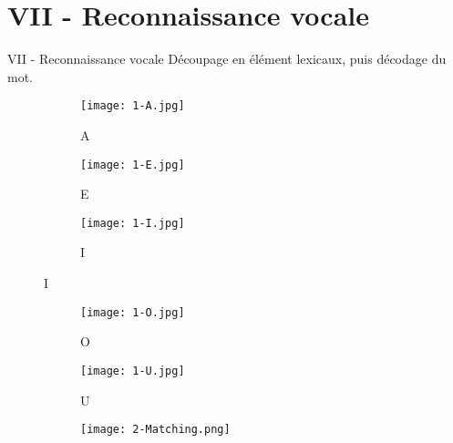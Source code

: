\section{VII - Reconnaissance vocale}
\begin{frame}{VII - Reconnaissance vocale}
Découpage en élément lexicaux, puis décodage du mot.
\begin{figure}
	\begin{subfigure}[]{0.3\textwidth}
		\texttt{[image: 1-A.jpg]}
  		\caption{A}
	\end{subfigure}
	\begin{subfigure}[]{0.3\textwidth}
		\texttt{[image: 1-E.jpg]}
  		\caption{E}
	\end{subfigure}
	\begin{subfigure}[]{0.3\textwidth}
		\texttt{[image: 1-I.jpg]}
		\caption{I}
	\end{subfigure}
\end{figure}
\begin{figure}
	\begin{subfigure}[]{0.3\textwidth}
		\texttt{[image: 1-O.jpg]}
  		\caption{O}
	\end{subfigure}
	\begin{subfigure}[]{0.3\textwidth}
		\texttt{[image: 1-U.jpg]}
  		\caption{U}
	\end{subfigure}
	\begin{subfigure}[]{0.3\textwidth}
		\texttt{[image: 2-Matching.png]}
	\end{subfigure}
\end{figure}
\end{frame}